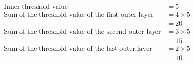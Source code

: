 \begin{align*}
	\text{Inner threshold value} &= 5 \\
	\text{Sum of the threshold value of the first outer layer} &= 4 \times 5 \\
	&= 20 \\
	\text{Sum of the threshold value of the second outer layer} &= 3 \times 5 \\
	&= 15 \\
	\text{Sum of the threshold value of the last outer layer} &= 2 \times 5 \\
	&= 10 \\
\end{align*}












